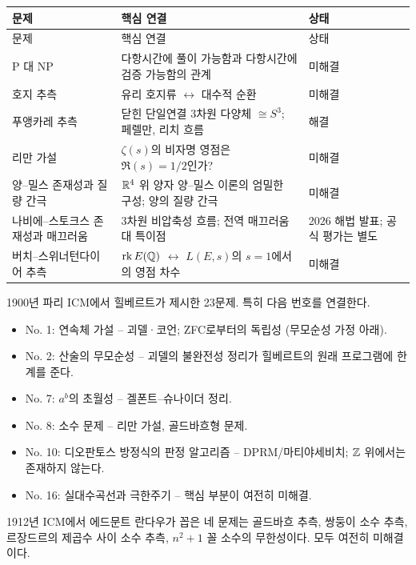 \begin{center}
\small
\renewcommand{\arraystretch}{1.08}
\begin{longtable}{@{}L{0.31\textwidth}L{0.47\textwidth}L{0.14\textwidth}@{}}
\toprule
문제 & 핵심 연결 & 상태\\
\midrule
\endfirsthead
\toprule 문제 & 핵심 연결 & 상태\\ \midrule \endhead
\bottomrule\endlastfoot
P 대 NP & 다항시간에 풀이 가능함과 다항시간에 검증 가능함의 관계 & 미해결\\
호지 추측 & 유리 호지류 $\leftrightarrow$ 대수적 순환 & 미해결\\
푸앵카레 추측 & 닫힌 단일연결 $3$차원 다양체 $\cong S^3$; 페렐만, 리치 흐름 & 해결\\
리만 가설 & $\zeta(s)$의 비자명 영점은 $\Re(s)=1/2$인가? & 미해결\\
양--밀스 존재성과 질량 간극 & $\mathbb{R}^4$ 위 양자 양--밀스 이론의 엄밀한 구성; 양의 질량 간극 & 미해결\\
나비에--스토크스 존재성과 매끄러움 & 3차원 비압축성 흐름; 전역 매끄러움 대 특이점 & 2026 해법 발표; 공식 평가는 별도\\
버치--스위너턴다이어 추측 & $\operatorname{rk} E(\mathbb{Q})$ $\leftrightarrow$ $L(E,s)$의 $s=1$에서의 영점 차수 & 미해결\\
\end{longtable}
\end{center}


1900년 파리 ICM에서 힐베르트가 제시한 23문제. 특히 다음 번호를 연결한다.
\begin{itemize}
\item No. 1: 연속체 가설 -- 괴델·코언; ZFC로부터의 독립성 (무모순성 가정 아래).
\item No. 2: 산술의 무모순성 -- 괴델의 불완전성 정리가 힐베르트의 원래 프로그램에 한계를 준다.
\item No. 7: $a^b$의 초월성 -- 겔폰트--슈나이더 정리.
\item No. 8: 소수 문제 -- 리만 가설, 골드바흐형 문제.
\item No. 10: 디오판토스 방정식의 판정 알고리즘 -- DPRM/마티야세비치; $\mathbb{Z}$ 위에서는 존재하지 않는다.
\item No. 16: 실대수곡선과 극한주기 -- 핵심 부분이 여전히 미해결.
\end{itemize}


1912년 ICM에서 에드문트 란다우가 꼽은 네 문제는 골드바흐 추측, 쌍둥이 소수 추측, 르장드르의 제곱수 사이 소수 추측, $n^2+1$ 꼴 소수의 무한성이다. 모두 여전히 미해결이다.

